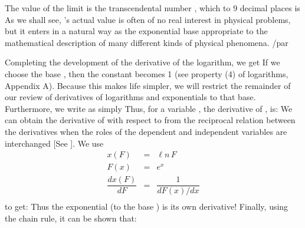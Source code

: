 {{%
%
The value of the limit is the transcendental number , which to 9 decimal
places is
%
%
As we shall see, 's actual value is often of no real interest in physical
problems, but it enters in a natural way as the exponential base appropriate
to the mathematical description of many different kinds of physical
phenomena.} /par
%
\par{Completing the development of the derivative of the logarithm, we get
%
%
If we choose the base , then the constant  becomes 1 (see
property (4) of logarithms, Appendix A).
Because this makes life simpler, we will restrict the remainder of our
review of derivatives of logarithms and exponentials to that base.
Furthermore, we write  as simply 
Thus, for a variable , the derivative of 
, is:
%
%
We can obtain the derivative of  with respect to  from the
reciprocal relation between the derivatives when the roles of the dependent
and independent variables are interchanged [See ].
We use
%
\begin{eqnarray*}
x(F) & = & \ell n\,F \\
F(x) & = & e^x \\
\dfrac{dx(F)}{dF} & = & \dfrac{1}{dF(x)/dx} \\
\end{eqnarray*}
%
to get:
%
%
Thus the exponential (to the base ) is its own derivative!
Finally, using the chain rule, it can be shown that:
%
}%
}%
%
